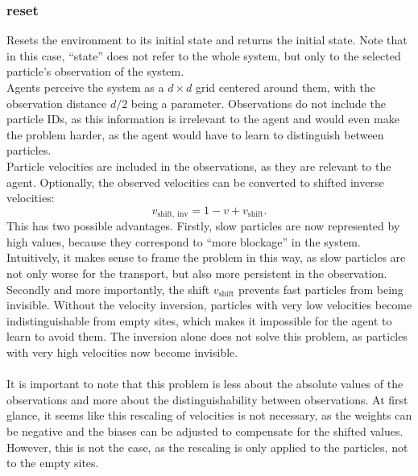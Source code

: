 \subsubsection{reset}
Resets the environment to its initial state and returns the initial state. Note that in this case, \enquote{state} does not refer to the whole system, but only to the selected particle's observation of the system. 
\\
Agents perceive the system as a $d\times d$ grid centered around them, with the observation distance $d/2$ being a parameter. Observations do not include the particle IDs, as this information is irrelevant to the agent and would even make the problem harder, as the agent would have to learn to distinguish between particles. 
\\
Particle velocities are included in the observations, as they are relevant to the agent. Optionally, the observed velocities can be converted to shifted inverse velocities:
\begin{equation}
    v_{\text{shift, inv}} = 1 - v + v_{\text{shift}} \text{.}
    \label{eq:inverse-velocities}
\end{equation}
This has two possible advantages. Firstly, slow particles are now represented by high values, because they correspond to \enquote{more blockage} in the system. Intuitively, it makes sense to frame the problem in this way, as slow particles are not only worse for the transport, but also more persistent in the observation. Secondly and more importantly, the shift $v_{\text{shift}}$ prevents fast particles from being invisible. Without the velocity inversion, particles with very low velocities become indistinguishable from empty sites, which makes it impossible for the agent to learn to avoid them. The inversion alone does not solve this problem, as particles with very high velocities now become invisible. 
\\
\\
It is important to note that this problem is less about the absolute values of the observations and more about the distinguishability between observations. At first glance, it seems like this rescaling of velocities is not necessary, as the weights can be negative and the biases can be adjusted to compensate for the shifted values. However, this is not the case, as the rescaling is only applied to the particles, not to the empty sites. 



